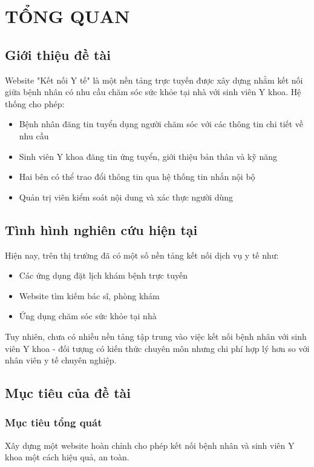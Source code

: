 \documentclass[a4paper,12pt]{report}
\begin{document}
\chapter{TỔNG QUAN}

\section{Giới thiệu đề tài}

Website "Kết nối Y tế" là một nền tảng trực tuyến được xây dựng nhằm kết nối giữa bệnh nhân có nhu cầu chăm sóc sức khỏe tại nhà với sinh viên Y khoa. Hệ thống cho phép:

\begin{itemize}
    \item Bệnh nhân đăng tin tuyển dụng người chăm sóc với các thông tin chi tiết về nhu cầu
    \item Sinh viên Y khoa đăng tin ứng tuyển, giới thiệu bản thân và kỹ năng
    \item Hai bên có thể trao đổi thông tin qua hệ thống tin nhắn nội bộ
    \item Quản trị viên kiểm soát nội dung và xác thực người dùng
\end{itemize}

\section{Tình hình nghiên cứu hiện tại}

Hiện nay, trên thị trường đã có một số nền tảng kết nối dịch vụ y tế như:
\begin{itemize}
    \item Các ứng dụng đặt lịch khám bệnh trực tuyến
    \item Website tìm kiếm bác sĩ, phòng khám
    \item Ứng dụng chăm sóc sức khỏe tại nhà
\end{itemize}

Tuy nhiên, chưa có nhiều nền tảng tập trung vào việc kết nối bệnh nhân với sinh viên Y khoa - đối tượng có kiến thức chuyên môn nhưng chi phí hợp lý hơn so với nhân viên y tế chuyên nghiệp.

\section{Mục tiêu của đề tài}

\subsection{Mục tiêu tổng quát}
Xây dựng một website hoàn chỉnh cho phép kết nối bệnh nhân và sinh viên Y khoa một cách hiệu quả, an toàn.
\end{document}
